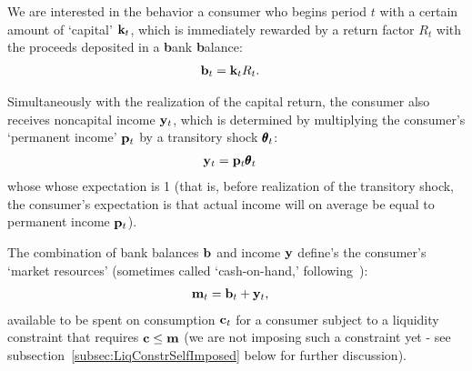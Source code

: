 \documentclass[titlepage, headings=optiontotocandhead]{Resources/texmf-local/tex/latex/econtex}
\begin{document}
We are interested in the behavior a consumer who begins {period} $t$ with a certain amount of `capital' $\mathbf{k}_{t}$, which is immediately rewarded by a return factor $R_{t}$  with the proceeds deposited in a \textbf{b}ank \textbf{b}alance:
\begin{equation}\begin{gathered}\begin{aligned}\label{eq:bLvl}
      \mathbf{b}_{t} & = \mathbf{k}_{t}R_{t}. 
    \end{aligned}\end{gathered}\end{equation}

Simultaneously with the realization of the capital return, the consumer also receives noncapital income $\mathbf{y}_{t}$, which is determined by multiplying the consumer's `permanent income' $\mathbf{p}_{t}$ by a transitory shock $\pmb{\theta}_{t}$:
\begin{equation}\begin{gathered}\begin{aligned}
      \mathbf{y}_{t} & = \mathbf{p}_{t}\pmb{\theta}_{t} \label{eq:yLvl}
    \end{aligned}\end{gathered}\end{equation}
whose whose expectation is 1 (that is, before realization of the transitory shock, the consumer's expectation is that actual income will on average be equal to permanent income $\mathbf{p}_{t}$).

The combination of bank balances $\mathbf{b}$ and income $\mathbf{y}$ define's the consumer's `market resources' (sometimes called `cash-on-hand,' following~\cite{deatonUnderstandingC}):
\begin{equation}\begin{gathered}\begin{aligned}
      \mathbf{m}_{t} & = \mathbf{b}_{t}+\mathbf{y}_{t} \label{eq:mLvl},
    \end{aligned}\end{gathered}\end{equation}
available to be spent on consumption $\mathbf{c}_{t}$ for a consumer subject to a liquidity constraint that requires $\mathbf{c} \leq \mathbf{m}$ (we are not imposing such a constraint yet - see subsection~\ref{subsec:LiqConstrSelfImposed} below for further discussion).
\end{document}
